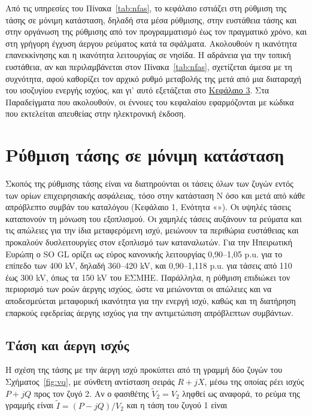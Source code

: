 Από τις υπηρεσίες του Πίνακα~\ref{tab:nfas}, το κεφάλαιο εστιάζει στη ρύθμιση της τάσης σε
μόνιμη κατάσταση, δηλαδή στα μέσα ρύθμισης, στην ευστάθεια τάσης και στην οργάνωση της ρύθμισης
από τον προγραμματισμό έως τον πραγματικό χρόνο, και στη γρήγορη έγχυση άεργου ρεύματος κατά
τα σφάλματα. Ακολουθούν η ικανότητα επανεκκίνησης και η ικανότητα λειτουργίας σε νησίδα. Η
αδράνεια για την τοπική ευστάθεια, αν και περιλαμβάνεται στον Πίνακα~\ref{tab:nfas}, σχετίζεται
άμεσα με τη συχνότητα, αφού καθορίζει τον αρχικό ρυθμό μεταβολής της μετά από μια διαταραχή του
ισοζυγίου ενεργής ισχύος, και γι' αυτό εξετάζεται στο \hyperref[kef-03-theoria]{Κεφάλαιο 3}.
Στα Παραδείγματα που ακολουθούν, οι έννοιες του κεφαλαίου εφαρμόζονται με κώδικα που εκτελείται
απευθείας στην ηλεκτρονική έκδοση.

\section{Ρύθμιση τάσης σε μόνιμη κατάσταση}
\label{sec:v-control}

Σκοπός της ρύθμισης τάσης είναι να διατηρούνται οι τάσεις όλων των ζυγών εντός των ορίων
επιχειρησιακής ασφάλειας, τόσο στην κατάσταση N όσο και μετά από κάθε απρόβλεπτο συμβάν του
καταλόγου (Κεφάλαιο 1, Ενότητα «»). Οι υψηλές τάσεις καταπονούν τη μόνωση του
εξοπλισμού. Οι χαμηλές τάσεις αυξάνουν τα ρεύματα και τις απώλειες για την ίδια μεταφερόμενη
ισχύ, μειώνουν τα περιθώρια ευστάθειας και προκαλούν δυσλειτουργίες στον εξοπλισμό των
καταναλωτών. Για την Ηπειρωτική Ευρώπη ο SO GL ορίζει ως εύρος κανονικής λειτουργίας
0,90--1,05 p.u. για το επίπεδο των 400 kV, δηλαδή 360--420 kV, και 0,90--1,118 p.u. για τάσεις
από 110 έως 300 kV, όπως τα 150 kV του ΕΣΜΗΕ. Παράλληλα, η ρύθμιση επιδιώκει τον περιορισμό
των ροών άεργης ισχύος, ώστε να μειώνονται οι απώλειες και να αποδεσμεύεται μεταφορική
ικανότητα για την ενεργή ισχύ, καθώς και τη διατήρηση επαρκούς εφεδρείας άεργης ισχύος για
την αντιμετώπιση απρόβλεπτων συμβάντων.

\subsection{Τάση και άεργη ισχύς}
\label{sec:v-q}

Η σχέση της τάσης με την άεργη ισχύ προκύπτει από τη γραμμή δύο ζυγών του
Σχήματος~\ref{fig:vq}, με σύνθετη αντίσταση σειράς $R + jX$, μέσω της οποίας ρέει ισχύς
$P + jQ$ προς τον ζυγό 2. Αν ο φασιθέτης $\tilde{V}_2 = V_2$ ληφθεί ως αναφορά, το ρεύμα της
γραμμής είναι $\tilde{I} = (P - jQ)/V_2$ και η τάση του ζυγού 1 είναι


